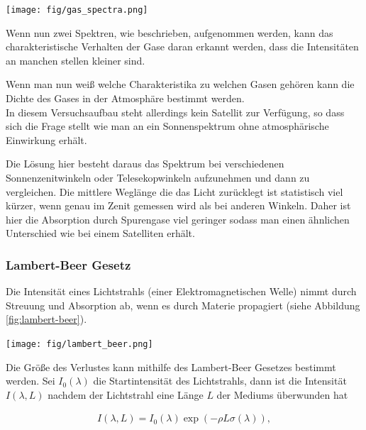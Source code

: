 \documentclass[12pt, a4paper, bibliography=totoc]{scrartcl}
\begin{document}
\begin{multicols}{2}
\begin{center}
    \texttt{[image: fig/gas\_spectra.png]}
    \label{fig:gas_spectra}
\end{center}

Wenn nun zwei Spektren, wie beschrieben, aufgenommen werden, 
kann das charakteristische Verhalten der Gase daran erkannt werden, dass die Intensitäten an manchen stellen kleiner sind.

Wenn man nun weiß welche Charakteristika zu welchen Gasen gehören kann die Dichte des Gases in der Atmosphäre bestimmt werden.\\
In diesem Versuchsaufbau steht allerdings kein Satellit zur Verfügung, so dass sich die Frage stellt wie man an ein Sonnenspektrum ohne atmosphärische Einwirkung erhält.

Die Lösung hier besteht daraus das Spektrum bei verschiedenen Sonnenzenitwinkeln oder Telesekopwinkeln aufzunehmen und dann zu vergleichen.
Die mittlere Weglänge die das Licht zurücklegt ist statistisch viel kürzer, wenn genau im Zenit gemessen wird als bei anderen Winkeln.
Daher ist hier die Absorption durch Spurengase viel geringer sodass man einen ähnlichen Unterschied wie bei einem Satelliten erhält.

\subsubsection{Lambert-Beer Gesetz}\label{sssec:Lamb-Beer_law}

Die Intensität eines Lichtstrahls (einer Elektromagnetischen Welle) nimmt durch Streuung und Absorption ab, wenn es durch Materie propagiert (siehe Abbildung \ref{fig:lambert-beer}).

\begin{center}
    \texttt{[image: fig/lambert\_beer.png]}
	\label{fig:lambert-beer}
\end{center}

Die Größe des Verlustes kann mithilfe des Lambert-Beer Gesetzes bestimmt werden.
Sei $I_0 (\lambda)$ die Startintensität des Lichtstrahls, dann ist die Intensität $I(\lambda, L)$ nachdem der Lichtstrahl eine Länge $L$ der Mediums überwunden hat
    
\begin{align}
    I(\lambda, L) = I_0 (\lambda) \exp \left( - \rho L \sigma (\lambda)\right) ,\label{eq:lambert_beer_law}
\end{align}


\end{multicols}
\end{document}
